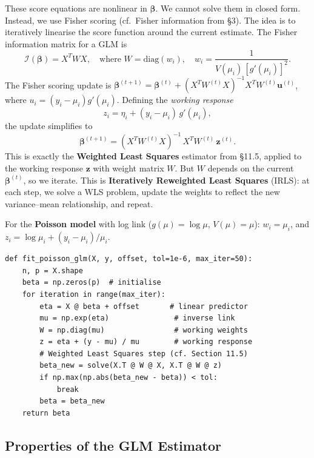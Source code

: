 \documentclass[11pt]{article}
\begin{document}
These score equations are nonlinear in $\boldsymbol{\beta}$. We cannot solve them in closed form.
Instead, we use Fisher scoring (cf.\ Fisher information from \S3). The idea is to iteratively
linearise the score function around the current estimate. The Fisher information matrix for a GLM is
\begin{equation*}
    \mathcal{I}(\boldsymbol{\beta}) = X^T W X, \quad \text{where } W = \mathrm{diag}(w_i),
    \quad w_i = \frac{1}{V(\mu_i)\,[g'(\mu_i)]^2}.
\end{equation*}
The Fisher scoring update is $\boldsymbol{\beta}^{(t+1)} = \boldsymbol{\beta}^{(t)} + (X^TW^{(t)}X)^{-1}X^TW^{(t)}\mathbf{u}^{(t)}$,
where $u_i = (y_i-\mu_i)g'(\mu_i)$. Defining the \textit{working response}
\begin{equation*}
    z_i = \eta_i + (y_i - \mu_i)\,g'(\mu_i),
\end{equation*}
the update simplifies to
\begin{equation*}
    \boldsymbol{\beta}^{(t+1)} = (X^TW^{(t)}X)^{-1}\,X^TW^{(t)}\,\mathbf{z}^{(t)}.
\end{equation*}
This is exactly the \textbf{Weighted Least Squares} estimator from \S11.5, applied to the working response
$\mathbf{z}$ with weight matrix $W$. But $W$ depends on the current $\boldsymbol{\beta}^{(t)}$, so
we iterate. This is \textbf{Iteratively Reweighted Least Squares} (IRLS): at each step, we solve a
WLS problem, update the weights to reflect the new variance--mean relationship, and repeat.

\noindent For the \textbf{Poisson model} with log link ($g(\mu)=\log\mu$, $V(\mu)=\mu$):
$w_i = \mu_i$, and $z_i = \log\mu_i + (y_i - \mu_i)/\mu_i$.

\begin{lstlisting}[style=python, caption={IRLS algorithm for Poisson GLM with log link.}]
def fit_poisson_glm(X, y, offset, tol=1e-6, max_iter=50):
    n, p = X.shape
    beta = np.zeros(p)  # initialise
    for iteration in range(max_iter):
        eta = X @ beta + offset       # linear predictor
        mu = np.exp(eta)               # inverse link
        W = np.diag(mu)                # working weights
        z = eta + (y - mu) / mu        # working response
        # Weighted Least Squares step (cf. Section 11.5)
        beta_new = solve(X.T @ W @ X, X.T @ W @ z)
        if np.max(np.abs(beta_new - beta)) < tol:
            break
        beta = beta_new
    return beta
\end{lstlisting}

\subsection{Properties of the GLM Estimator}
\end{document}
